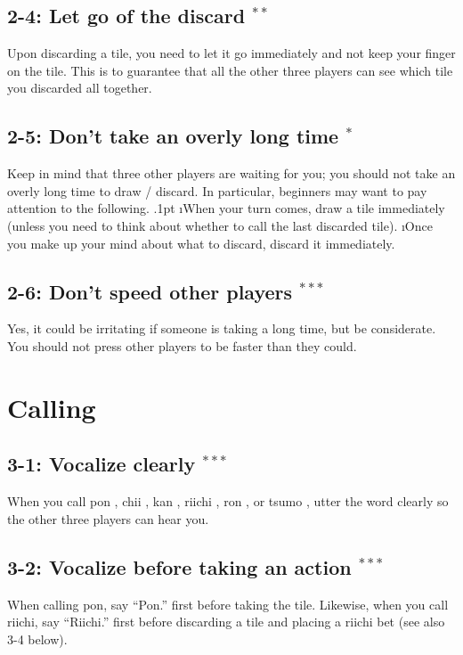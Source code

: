 \subsection*{2-4: Let go of the discard $^{**}$}
Upon discarding a tile, you need to let it go immediately and not keep your finger on the tile. This is to guarantee that all the other three players can see which tile you discarded all together.

\subsection*{2-5: Don't take an overly long time $^{*}$}
Keep in mind that three other players are waiting for you; you should not take an overly long time to draw / discard. In particular, beginners may want to pay attention to the following. 
\bi\itemsep.1pt
\i When your turn comes, draw a tile immediately (unless you need to think about whether to call the last discarded tile). 
\i Once you make up your mind about what to discard, discard it immediately.
\ei

\subsection*{2-6: Don't speed other players $^{***}$}
Yes, it could be irritating if someone is taking a long time, but be considerate.
You should not press other players to be faster than they could.

\section{Calling}

\subsection*{3-1: Vocalize clearly $^{***}$}
When you call {\jap pon} \textipa{[p\'\textopeno\ng]}, {\jap chii} , {\jap kan} \textipa{[k\'\textturnv\ng]}, riichi , {\jap ron} \textipa{[r\'\textopeno\ng]}, or {\jap tsumo} \textipa{[ts\'umo]}, utter the word clearly so the other three players can hear you. 

\subsection*{3-2: Vocalize before taking an action $^{***}$}
When calling {\jap pon}, say ``{\jap Pon}.'' first before taking the tile. Likewise, when you call riichi, say ``{\jap Riichi}.'' first before discarding a tile and placing a riichi bet (see also 3-4 below). 

